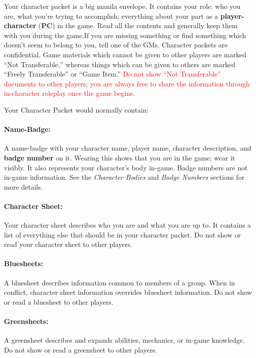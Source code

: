 \documentclass[sheet]{GL2020}
\begin{document}
Your character packet is a big manila envelope.  It contains your role: who you are, what you're trying to accomplish; everything about your part as a {\bf player-character} ({\bf PC}) in the game. Read all the contents and generally keep them with you during the game.If you are missing something or find something which doesn't seem to belong to you, tell one of the GMs.  Character packets are confidential. Game materials which cannot be given to other players are marked ``Not Transferable,'' whereas things which can be given to others are marked ``Freely Transferable'' or ``Game Item.''  \textcolor{red}{Do not show ``Not Transferable'' documents to other players; you are always free to share the information through in-character roleplay once the game begins.}

Your Character Packet would normally contain:
\paragraph{Name-Badge:} A name-badge with your character name, player name, character description, and {\bf badge number} on it. Wearing this shows that you are in the game; wear it visibly.  It also represents your character's body in-game.  Badge numbers are not in-game information. See the \emph{Character Bodies} and \emph{Badge Numbers} sections for more details.

\paragraph{Character Sheet:} Your character sheet describes who you are and what you are up to.  It contains a list of everything else that should be in your character packet. Do not show or read your character sheet to other players.

\paragraph{Bluesheets:} A bluesheet describes information common to members of a group.  When in conflict, character sheet information overrides bluesheet information. Do not show or read a bluesheet to other players.

\paragraph{Greensheets:} A greensheet describes and expands abilities, mechanics, or in-game knowledge. Do not show or read a greensheet to other players.
\end{document}
